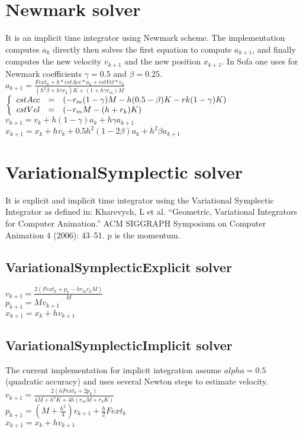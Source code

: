 \documentclass[12pt]{article}
\begin{document}
\begin{doublespace}
\section{Newmark solver}
It is an implicit time integrator using Newmark scheme.
The implementation computes $a_{k}$ directly then solves the first equation to compute $a_{k+1}$, and finally computes the new velocity $v_{k+1}$ and the new position $x_{k+1}$. In Sofa one uses for Newmark coefficients $\gamma=0.5$ and $\beta=0.25$.
\\$ a_{k+1} = \frac{Fext_{k} + h*cstAcc*a_{k}+cstVel*v_{k}}{(h^2\beta + h\gamma r_{k})K+(1+h\gamma r_{m})M} $
$\left\{
\begin{array}{r c l}
cstAcc &=& (-r_{m}(1-\gamma)M-h(0.5-\beta)K-rk(1-\gamma)K)\\
cstVel &=& (-r_{m}M-(h+r_{k})K)
\end{array}
\right.$
\\$ v_{k+1} = v_{k}+h(1-\gamma)a_{k}+h\gamma a_{k+1} $
\\$ x_{k+1} = x_{k}+hv_{k}+0.5h^2(1-2\beta)a_{k}+h^2\beta a_{k+1} $

\section{VariationalSymplectic solver}
It is explicit and implicit time integrator using the Variational Symplectic Integrator as defined in: Kharevych, L et al. “Geometric, Variational Integrators for Computer Animation.” ACM SIGGRAPH Symposium on Computer Animation 4 (2006): 43–51. p is the momentum.

\subsection{VariationalSymplecticExplicit solver}

$ v_{k+1} = \frac{2(Fext_{k}+p_{k}-hr_{m}v_{k}M)}{M} $
\\$ p_{k+1} = Mv_{k+1} $
\\$ x_{k+1} = x_{k}+hv_{k+1} $

\subsection{VariationalSymplecticImplicit solver}
The current implementation for implicit integration assume $alpha=0.5$ (quadratic accuracy) and uses several Newton steps to estimate velocity.
\\$ v_{k+1} = \frac{2(hFext_{k}+2p_{k})}{4M+h^2K+4h(r_{m}M+r_{k}K)} $
\\$ p_{k+1} = (M+\frac{h^2}{4})v_{k+1}+\frac{h}{2}Fext_{k} $
\\$ x_{k+1} = x_{k}+hv_{k+1} $


\end{doublespace}
\end{document}
